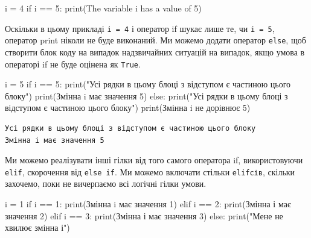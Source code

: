 \documentclass[
  letterpaper,
]{report}
\newenvironment{Shaded}{\begin{snugshade}}{\end{snugshade}}
\newcommand{\BuiltInTok}[1]{\textcolor[rgb]{0.00,0.23,0.31}{#1}}
\newcommand{\ControlFlowTok}[1]{\textcolor[rgb]{0.00,0.23,0.31}{#1}}
\newcommand{\DecValTok}[1]{\textcolor[rgb]{0.68,0.00,0.00}{#1}}
\newcommand{\NormalTok}[1]{\textcolor[rgb]{0.00,0.23,0.31}{#1}}
\newcommand{\OperatorTok}[1]{\textcolor[rgb]{0.37,0.37,0.37}{#1}}
\newcommand{\StringTok}[1]{\textcolor[rgb]{0.13,0.47,0.30}{#1}}
\begin{document}
\begin{Shaded}
\begin{Highlighting}[]
\NormalTok{i }\OperatorTok{=} \DecValTok{4}
\ControlFlowTok{if}\NormalTok{ i }\OperatorTok{==} \DecValTok{5}\NormalTok{:}
    \BuiltInTok{print}\NormalTok{(}\StringTok{\textquotesingle{}The variable i has a value of 5\textquotesingle{}}\NormalTok{)}
\end{Highlighting}
\end{Shaded}

Оскільки в цьому прикладі \texttt{i\ =\ 4} і оператор if шукає лише те,
чи \texttt{i\ =\ 5}, оператор print ніколи не буде виконаний. Ми можемо
додати оператор \texttt{else}, щоб створити блок коду на випадок
надзвичайних ситуацій на випадок, якщо умова в операторі if не буде
оцінена як \texttt{True}.

\begin{Shaded}
\begin{Highlighting}[]
\NormalTok{i }\OperatorTok{=} \DecValTok{5}
\ControlFlowTok{if}\NormalTok{ i }\OperatorTok{==} \DecValTok{5}\NormalTok{:}
    \BuiltInTok{print}\NormalTok{(}\StringTok{"Усі рядки в цьому блоці з відступом є частиною цього блоку"}\NormalTok{)}
    \BuiltInTok{print}\NormalTok{(}\StringTok{\textquotesingle{}Змінна i має значення 5\textquotesingle{}}\NormalTok{)}
\ControlFlowTok{else}\NormalTok{:}
    \BuiltInTok{print}\NormalTok{(}\StringTok{"Усі рядки в цьому блоці з відступом є частиною цього блоку"}\NormalTok{)}
    \BuiltInTok{print}\NormalTok{(}\StringTok{\textquotesingle{}Змінна i не дорівнює 5\textquotesingle{}}\NormalTok{)}
\end{Highlighting}
\end{Shaded}

\begin{verbatim}
Усі рядки в цьому блоці з відступом є частиною цього блоку
Змінна i має значення 5
\end{verbatim}

Ми можемо реалізувати інші гілки від того самого оператора if,
використовуючи \texttt{elif}, скорочення від \texttt{else\ if}. Ми
можемо включати стільки \texttt{elifсів}, скільки захочемо, поки не
вичерпаємо всі логічні гілки умови.

\begin{Shaded}
\begin{Highlighting}[]
\NormalTok{i }\OperatorTok{=} \DecValTok{1}
\ControlFlowTok{if}\NormalTok{ i }\OperatorTok{==} \DecValTok{1}\NormalTok{:}
    \BuiltInTok{print}\NormalTok{(}\StringTok{\textquotesingle{}Змінна i має значення 1\textquotesingle{}}\NormalTok{)}
\ControlFlowTok{elif}\NormalTok{ i }\OperatorTok{==} \DecValTok{2}\NormalTok{:}
    \BuiltInTok{print}\NormalTok{(}\StringTok{\textquotesingle{}Змінна і має значення 2\textquotesingle{}}\NormalTok{)}
\ControlFlowTok{elif}\NormalTok{ i }\OperatorTok{==} \DecValTok{3}\NormalTok{:}
    \BuiltInTok{print}\NormalTok{(}\StringTok{\textquotesingle{}Змінна і має значення 3\textquotesingle{}}\NormalTok{)}
\ControlFlowTok{else}\NormalTok{:}
    \BuiltInTok{print}\NormalTok{(}\StringTok{"Мене не хвилює змінна і"}\NormalTok{)}
\end{Highlighting}
\end{Shaded}
\end{document}
